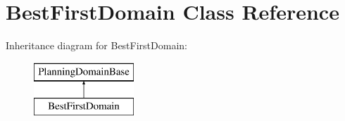 \hypertarget{class_best_first_domain}{\section{Best\-First\-Domain Class Reference}
\label{class_best_first_domain}
}
Inheritance diagram for Best\-First\-Domain\-:\begin{figure}[H]
\begin{center}
\leavevmode
\includegraphics[height=2.000000cm]{class_best_first_domain}
\end{center}
\end{figure}
